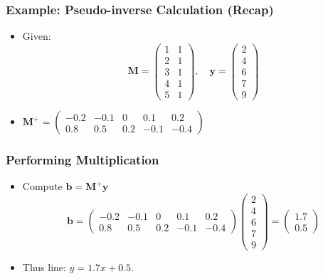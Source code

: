 \documentclass[aspectratio=169]{beamer}
\begin{document}

\begin{frame}
\frametitle{Example: Pseudo-inverse Calculation (Recap)}
\begin{itemize}[<+->]
\item Given:
\[
\mathbf{M} = \begin{pmatrix}
1 & 1\\2 &1\\3 &1\\4 &1\\5 &1
\end{pmatrix}, \quad
\mathbf{y}=\begin{pmatrix}2\\4\\6\\7\\9\end{pmatrix}
\]
\item $\mathbf{M}^+ = \begin{pmatrix}-0.2 & -0.1 & 0 & 0.1 & 0.2\\0.8 & 0.5 &0.2 & -0.1 & -0.4\end{pmatrix}$
\end{itemize}
\end{frame}

\begin{frame}
\frametitle{Performing Multiplication}
\begin{itemize}[<+->]
\item Compute $\mathbf{b} = \mathbf{M}^+\mathbf{y}$
\[
\mathbf{b} = \begin{pmatrix}-0.2 & -0.1 & 0 & 0.1 &0.2\\0.8 &0.5 &0.2 &-0.1 &-0.4\end{pmatrix}
\begin{pmatrix}2\\4\\6\\7\\9\end{pmatrix} = \begin{pmatrix}1.7 \\0.5\end{pmatrix}
\]
\item Thus line: $y=1.7x+0.5$.
\end{itemize}
\end{frame}


\end{document}
